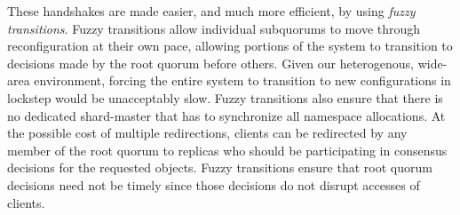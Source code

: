 
These handshakes are made easier, and much more efficient, by using \emph{fuzzy transitions}.
Fuzzy transitions allow individual subquorums to move through reconfiguration at their own pace, allowing portions of the system to transition to decisions made by the root quorum before others.
Given our heterogenous, wide-area environment, forcing the entire system to transition to new configurations in lockstep would be unacceptably slow.
Fuzzy transitions also ensure that there is no dedicated shard-master that has to synchronize all namespace allocations.
At the possible cost of multiple redirections, clients can be redirected by any member of the root quorum to replicas who should be participating in consensus decisions for the requested objects.
Fuzzy transitions ensure that root quorum decisions need not be timely since those decisions do not disrupt accesses of clients.

